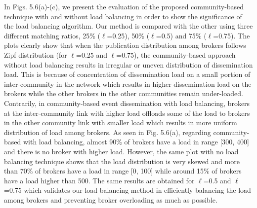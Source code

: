 In Figs. 5.6(a)-(c), we present the evaluation of the proposed community-based technique with and without load balancing in order to show the significance of the load balancing algorithm. Our method is compared with the other using three different matching ratios, 25\% ($\ell$=0.25), 50\% ($\ell$=0.5) and 75\% ($\ell$=0.75). The plots clearly show that when the publication distribution among brokers follows Zipf distribution (for $\ell$=0.25 and $\ell$=0.75), the community-based approach without load balancing results in irregular or uneven distribution of dissemination load. This is because of concentration of dissemination load on a small portion of inter-community in the network which results in higher dissemination load on the brokers while the other brokers in the other communities remain under-loaded. Contrarily, in community-based event dissemination with load balancing, brokers at the inter-community link with higher load offloads some of the load to brokers in the other community link with smaller load which results in more uniform distribution of load among brokers. As seen in Fig. 5.6(a), regarding community-based with load balancing, almost 90\% of brokers have a load in range [300, 400] and there is no broker with higher load. However, the same plot with no load balancing technique shows that the load distribution is very skewed and more than 70\% of brokers have a load in range [0, 100] while around 15\% of brokers have a load higher than 500. The same results are obtained for $\ell$=0.5 and $\ell$=0.75 which validates our load balancing method in efficiently balancing the load among brokers and preventing broker overloading as much as possible.


